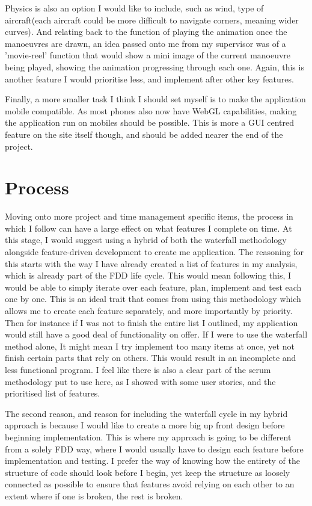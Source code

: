 Physics is also an option I would like to include, such as wind, type of aircraft(each aircraft could be more difficult to navigate corners, meaning wider curves). And relating back to the function of playing the animation once the manoeuvres are drawn, an idea passed onto me from my supervisor was of a 'movie-reel' function that would show a mini image of the current manoeuvre being played, showing the animation progressing through each one. Again, this is another feature I would prioritise less, and implement after other key features.

Finally, a more smaller task I think I should set myself is to make the application mobile compatible. As most phones also now have WebGL capabilities, making the application run on mobiles should be possible. This is more a GUI centred feature on the site itself though, and should be added nearer the end of the project.

\section{Process}
Moving onto more project and time management specific items, the process in which I follow can have a large effect on what features I complete on time. At this stage, I would suggest using a hybrid of both the waterfall methodology alongside feature-driven development to create me application. The reasoning for this starts with the way I have already created a list of features in my analysis, which is already part of the FDD life cycle. This would mean following this, I would be able to simply iterate over each feature, plan, implement and test each one by one. This is an ideal trait that comes from using this methodology which allows me to create each feature separately, and more importantly by priority. Then for instance if I was not to finish the entire list I outlined, my application would still have a good deal of functionality on offer. If I were to use the waterfall method alone, It might mean I try implement too many items at once, yet not finish certain parts that rely on others. This would result in an incomplete and less functional program. I feel like there is also a clear part of the scrum methodology put to use here, as I showed with some user stories, and the prioritised list of features.

The second reason, and reason for including the waterfall cycle in my hybrid approach is because I would like to create a more big up front design before beginning implementation. This is where my approach is going to be different from a solely FDD way, where I would usually have to design each feature before implementation and testing. I prefer the way of knowing how the entirety of the structure of code should look before I begin, yet keep the structure as loosely connected as possible to ensure that features avoid relying on each other to an extent where if one is broken, the rest is broken. 

